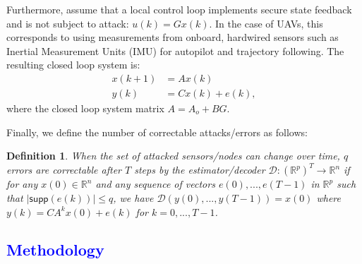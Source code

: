 \documentclass[12pt, conference, a4paper, twoside]{IEEEconf_mod}
\newtheorem{Def}{\bf{Definition}}
\begin{document}
Furthermore, assume that a local control loop implements secure state feedback and is not subject to attack: $u(k) = Gx(k)$. In the case of UAVs, this corresponds to using measurements from onboard, hardwired sensors such as Inertial Measurement Units (IMU) for autopilot and trajectory following. The resulting closed loop system is:
\begin{equation}
\begin{aligned}
x(k+1) &= A x(k)\\
y(k) &= C x(k) + e(k),
\end{aligned} 
\label{eq:system_model_cl}
\end{equation} 
where the closed loop system matrix $A=A_o+BG$. 

Finally, we define the number of correctable attacks/errors as follows:
\begin{Def}\label{def:num_err_change}
When the set of attacked sensors/nodes can change over time, $q$ errors are correctable after $T$ steps by the estimator/decoder $\mathcal{D}: {(\mathbb{R} ^p) } ^T  \rightarrow \mathbb{R}^n$ if for any $x(0) \in \mathbb{R}^n$ and any sequence of vectors $e(0),...,e(T-1)$ in $\mathbb{R}^p$ such that $\lvert \textsf{supp}(e(k)) \rvert \leq q$, 
we have $\mathcal{D} (y(0),...,y(T-1)) = x(0)$ where $y(k) = CA^k x(0) + e(k)$ for $k=0,...,T-1$.
\end{Def}




\subsection{\textcolor{blue}{Methodology}}
\end{document}
